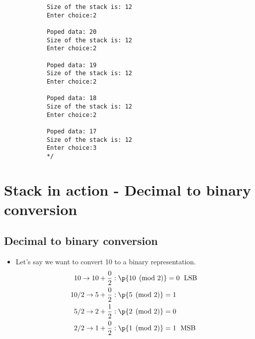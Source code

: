 \begin{itemize}
\begin{verbatim}
            Size of the stack is: 12
            Enter choice:2

            Poped data: 20
            Size of the stack is: 12
            Enter choice:2

            Poped data: 19
            Size of the stack is: 12
            Enter choice:2

            Poped data: 18
            Size of the stack is: 12
            Enter choice:2

            Poped data: 17
            Size of the stack is: 12
            Enter choice:3
            */
        \end{verbatim}
\end{itemize}

\section{Stack in action - Decimal to binary conversion}
\subsection{Decimal to binary conversion}
\begin{itemize}
    \item Let's say we want to convert 10 to a binary representation. 
        \begin{align*}
            10  \rightarrow 10+\frac{0}{2}:\; & \p{10 \pmod{2}} =  0 \;\text{ LSB }\\ 
            10/2\rightarrow 5+\frac{0}{2}:\;  & \p{5 \pmod{2}} = 1 \\  
            5/2 \rightarrow 2+\frac{1}{2}:\;  & \p{2  \pmod{2}} = 0 \\ 
            2/2 \rightarrow 1+\frac{0}{2}:\;  & \p{1 \pmod{2}} = 1 \;\text{ MSB }\\
        \end{align*}
\end{itemize}

